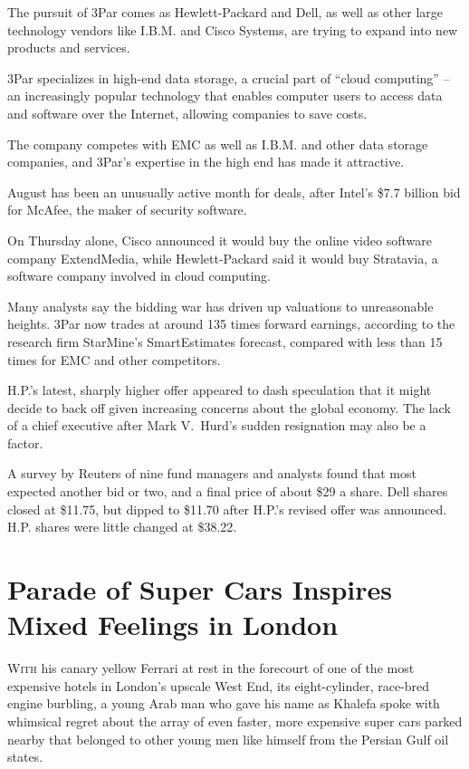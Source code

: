 ﻿\documentclass[12pt]{article}
\begin{document}
The pursuit of 3Par comes as Hewlett-Packard and Dell, as well as other large technology vendors
like I.B.M. and Cisco Systems, are trying to expand into new products and services.

3Par specializes in high-end data storage, a crucial part of ``cloud computing'' -- an increasingly
popular technology that enables computer users to access data and software over the Internet,
allowing companies to save costs.

The company competes with EMC as well as I.B.M. and other data storage companies, and 3Par's
expertise in the high end has made it attractive.

August has been an unusually active month for deals, after Intel's \$7.7 billion bid for McAfee, the
maker of security software.

On Thursday alone, Cisco announced it would buy the online video software company ExtendMedia, while
Hewlett-Packard said it would buy Stratavia, a software company involved in cloud computing.

Many analysts say the bidding war has driven up valuations to unreasonable heights. 3Par now trades
at around 135 times forward earnings, according to the research firm StarMine's SmartEstimates
forecast, compared with less than 15 times for EMC and other competitors.

H.P.'s latest, sharply higher offer appeared to dash speculation that it might decide to back off
given increasing concerns about the global economy. The lack of a chief executive after Mark
V.~Hurd's sudden resignation may also be a factor.

A survey by Reuters of nine fund managers and analysts found that most expected another bid or two,
and a final price of about \$29 a share. Dell shares closed at \$11.75, but dipped to \$11.70 after
H.P.'s revised offer was announced. H.P. shares were little changed at \$38.22.

\pagebreak
\section{Parade of Super Cars Inspires Mixed Feelings in London}

\lettrine{W}{ith} his canary yellow Ferrari at rest in the forecourt of one
of the most expensive hotels in London's upscale West End, its eight-cylinder, race-bred engine
burbling, a young Arab man who gave his name as Khalefa spoke with whimsical regret about the array
of even faster, more expensive super cars parked nearby that belonged to other young men like
himself from the Persian Gulf oil states.
\end{document}
